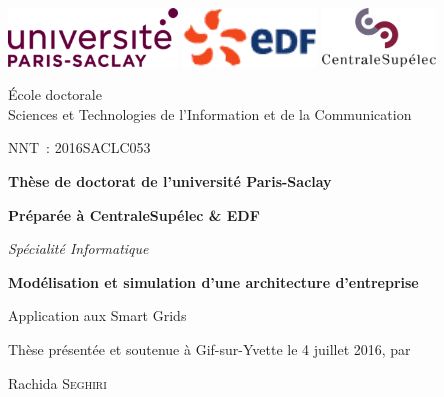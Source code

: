 \begin{titlepage}
\newcommand{\Mme}{M\textsuperscript{me}}
\vspace*{-2.5cm}
\includegraphics[height=1.55cm]{logo/ParisSaclay}\hfill
\includegraphics[height=1.55cm]{logo/Logo_EDF}\hfill
\includegraphics[height=1.55cm]{logo/CentraleSupelec}

\hrulefill

\begin{minipage}[t]{0.6\textwidth}
    {\small
        École doctorale \\
        Sciences et Technologies de l'Information et de la Communication\\
    }
\end{minipage}
\hfill
\begin{minipage}[t]{0.3\textwidth}
    NNT~: 2016SACLC053
\end{minipage}

\bigskip
\bigskip

\begin{center}
{\large\bfseries Thèse de doctorat de l'université Paris-Saclay}

{\large\bfseries Préparée à CentraleSupélec \& EDF}

{\large \textit{Spécialité Informatique}}

\vfill

{\LARGE\bfseries
    Modélisation et simulation d'une architecture d'entreprise
    
    Application aux Smart Grids
}

\vfill

{\large Thèse présentée et soutenue à Gif-sur-Yvette le 4 juillet 2016, par}


\bigskip

{\Large Rachida \textsc{Seghiri}}


\end{center}
\end{titlepage}
